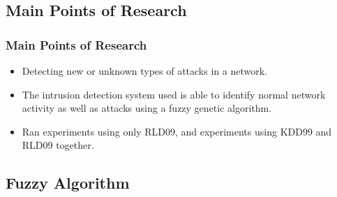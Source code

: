 \documentclass{beamer}
\newcommand{\linespace}{\vskip 0.25cm}
\begin{document}
\subsection{Main Points of Research}
\begin{frame}
  \frametitle{Main Points of Research}
	\begin{itemize}
		\item Detecting new or unknown types of attacks in a network.
		\item The intrusion detection system used is able to identify normal network activity as well as attacks using a fuzzy genetic algorithm.
		
		\linespace
		\linespace
		
		\item Ran experiments using only RLD09, and experiments using KDD99 and RLD09 together.
	\end{itemize}
\end{frame}


\subsection{Fuzzy Algorithm}
\end{document}
